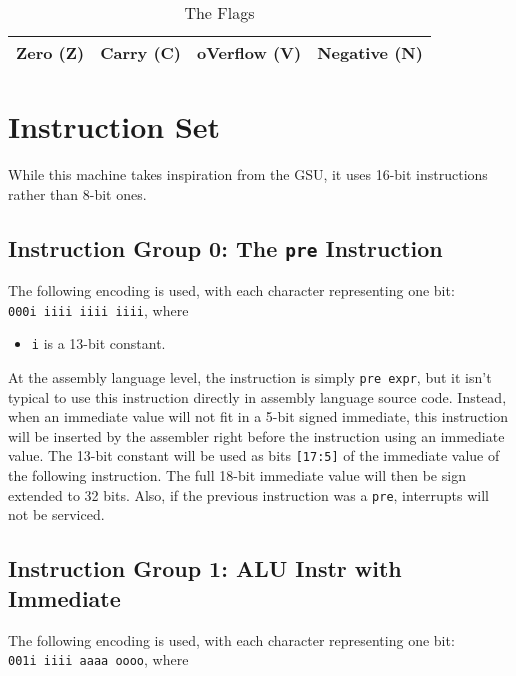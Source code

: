 \documentclass{article}
\begin{document}
	\begin{table}[H]
		\begin{center}
			\caption{The Flags}
			\label{tab:flags}
			\begin{tabular}{|c|c|c|c|}
				\hline
				Zero (Z) & Carry (C) & oVerflow (V) & Negative (N)\\
				\hline
			\end{tabular}
		\end{center}
	\end{table}

	\newpage
	\section{Instruction Set}
	While this machine takes inspiration from the GSU, it uses 16-bit
	instructions rather than 8-bit ones.

	\subsection{Instruction Group 0:  The \texttt{pre} Instruction}
	The following encoding is used, with each character representing one
	bit:  \\
	\texttt{000i iiii iiii iiii}, where 
	
	\singlespacing
	\begin{itemize}
		\item \texttt{i} is a 13-bit constant.
	\end{itemize}

	At the assembly language level, the instruction is simply
	\texttt{pre expr}, but it isn't typical to use this instruction
	directly in assembly language source code.  Instead, when an immediate
	value will not fit in a 5-bit signed immediate, this instruction will
	be inserted by the assembler right before the instruction using an
	immediate value.  The 13-bit constant will be used as bits
	\texttt{[17:5]} of the immediate value of the following instruction.
	The full 18-bit immediate value will then be sign extended to 32 bits.
	Also, if the previous instruction was a \texttt{pre}, interrupts will
	not be serviced.

	\subsection{Instruction Group 1:  ALU Instr with Immediate}
	The following encoding is used, with each character representing one
	bit:  \\
	\texttt{001i iiii aaaa oooo}, where
\end{document}
